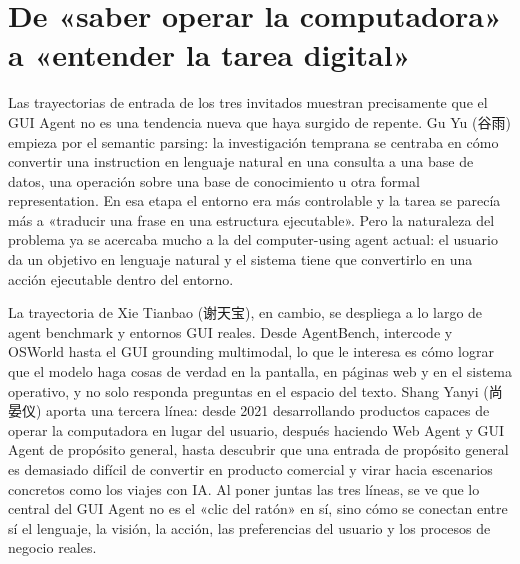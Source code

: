 \documentclass[a4paper]{article}
\begin{document}
\section{De «saber operar la computadora» a «entender la tarea digital»}

Las trayectorias de entrada de los tres invitados muestran precisamente que el GUI Agent no es una tendencia nueva que haya surgido de repente. Gu Yu (谷雨) empieza por el semantic parsing: la investigación temprana se centraba en cómo convertir una instruction en lenguaje natural en una consulta a una base de datos, una operación sobre una base de conocimiento u otra formal representation. En esa etapa el entorno era más controlable y la tarea se parecía más a «traducir una frase en una estructura ejecutable». Pero la naturaleza del problema ya se acercaba mucho a la del computer-using agent actual: el usuario da un objetivo en lenguaje natural y el sistema tiene que convertirlo en una acción ejecutable dentro del entorno.

La trayectoria de Xie Tianbao (谢天宝), en cambio, se despliega a lo largo de agent benchmark y entornos GUI reales. Desde AgentBench, intercode y OSWorld hasta el GUI grounding multimodal, lo que le interesa es cómo lograr que el modelo haga cosas de verdad en la pantalla, en páginas web y en el sistema operativo, y no solo responda preguntas en el espacio del texto. Shang Yanyi (尚晏仪) aporta una tercera línea: desde 2021 desarrollando productos capaces de operar la computadora en lugar del usuario, después haciendo Web Agent y GUI Agent de propósito general, hasta descubrir que una entrada de propósito general es demasiado difícil de convertir en producto comercial y virar hacia escenarios concretos como los viajes con IA. Al poner juntas las tres líneas, se ve que lo central del GUI Agent no es el «clic del ratón» en sí, sino cómo se conectan entre sí el lenguaje, la visión, la acción, las preferencias del usuario y los procesos de negocio reales.
\end{document}
